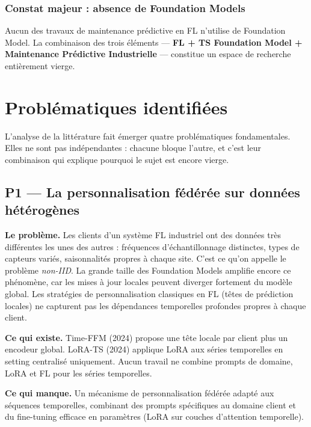 \documentclass[12pt, a4paper]{report}
\begin{document}
\subsection{Constat majeur : absence de Foundation Models}

Aucun des travaux de maintenance prédictive en FL n'utilise de Foundation Model. La
combinaison des trois éléments --- \textbf{FL + TS Foundation Model + Maintenance
Prédictive Industrielle} --- constitue un espace de recherche entièrement vierge.

\chapter{Problématiques identifiées}

L'analyse de la littérature fait émerger quatre problématiques fondamentales. Elles
ne sont pas indépendantes : chacune bloque l'autre, et c'est leur combinaison qui
explique pourquoi le sujet est encore vierge.

\section{P1 — La personnalisation fédérée sur données hétérogènes}

\textbf{Le problème.} Les clients d'un système FL industriel ont des données très
différentes les unes des autres : fréquences d'échantillonnage distinctes, types de
capteurs variés, saisonnalités propres à chaque site. C'est ce qu'on appelle le
problème \textit{non-IID}. La grande taille des Foundation Models amplifie encore
ce phénomène, car les mises à jour locales peuvent diverger fortement du modèle global.
Les stratégies de personnalisation classiques en FL (têtes de prédiction locales)
ne capturent pas les dépendances temporelles profondes propres à chaque client.

\textbf{Ce qui existe.} Time-FFM (2024) propose une tête locale par client plus un
encodeur global. LoRA-TS (2024) applique LoRA aux séries temporelles en setting
centralisé uniquement. Aucun travail ne combine prompts de domaine, LoRA et FL pour
les séries temporelles.

\textbf{Ce qui manque.} Un mécanisme de personnalisation fédérée adapté aux séquences
temporelles, combinant des prompts spécifiques au domaine client et du fine-tuning
efficace en paramètres (LoRA sur couches d'attention temporelle).
\end{document}
